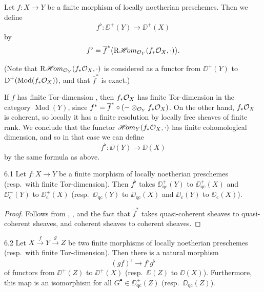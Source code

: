 \begin{definition*}
Let $f\colon X\to Y$ be a finite morphism of locally noetherian preschemes. Then we define
\[
f^{\flat}\colon \DD^+(Y) \longrightarrow \DD^+(X)
\]
by
\[
f^{\flat} = \overline{f}^*\bigl(\mathop{\mathrm{R}\mathscr{H}\!om}\nolimits_{\mathcal{O}_Y}(f_*\mathcal{O}_X, \cdot)\bigr).
\]

(Note that $\mathop{\mathrm{R}\mathscr{H}\!om}\nolimits_{\mathcal{O}_Y}(f_*\mathcal{O}_X,\cdot)$ is considered as a functor from $\DD^+(Y)$ to $\operatorname{D}^+(\operatorname{Mod}(f_*\mathcal{O}_X))$, and that $\overline{f}^*$ is exact.)

If $f$ has finite Tor-dimension , then $f_*\mathcal{O}_X$ has finite Tor-dimension in the category $\operatorname{Mod}(Y)$, since $f^*=\overline{f}^*\circ(-\otimes_{\mathcal{O}_Y}f_*\mathcal{O}_X)$. On the other hand, $f_*\mathcal{O}_X$ is coherent, so locally it has a finite resolution by locally free sheaves of finite rank. We conclude that the functor $\mathop{\mathscr{H}\!om}\nolimits_Y(f_*\mathcal{O}_X,\cdot)$ has finite cohomological dimension, and so in that case we can define
\[
f^{\flat}\colon \DD(Y) \longrightarrow \DD(X)
\]
by the same formula as above.
\end{definition*}

\begin{bookproposition}{6.1}\label{prop:3.6.1}
Let $f\colon X\to Y$ be a finite morphism of locally noetherian preschemes (resp.\ with finite Tor-dimension). Then $f^{\flat}$ takes $\DD_{\mathrm{qc}}^+(Y)$ to $\DD_{\mathrm{qc}}^+(X)$ and $\DD_{\mathrm{c}}^+(Y)$ to $\DD_{\mathrm{c}}^+(X)$ (resp.\ $\DD_{\mathrm{qc}}(Y)$ to $\DD_{\mathrm{qc}}(X)$ and $\DD_{\mathrm{c}}(Y)$ to $\DD_{\mathrm{c}}(X)$).
\end{bookproposition}

\begin{proof}
Follows from , , and the fact that $\overline{f}^*$ takes quasi-coherent sheaves to quasi-coherent sheaves, and coherent sheaves to coherent sheaves.
\end{proof}

\begin{bookproposition}{6.2}\label{prop:3.6.2}
Let $X\xrightarrow{f} Y\xrightarrow{g} Z$ be two finite morphisms of locally noetherian preschemes (resp.\ with finite Tor-dimension). Then there is a natural morphism
\[
(gf)^{\flat} \longrightarrow f^{\flat}g^{\flat}
\]
of functors from $\DD^+(Z)$ to $\DD^+(X)$ (resp.\ $\DD(Z)$ to $\DD(X)$). Furthermore, this map is an isomorphism for all $G^\bullet\in\DD_{\mathrm{qc}}^+(Z)$ (resp.\ $\DD_{\mathrm{qc}}(Z)$).
\end{bookproposition}


